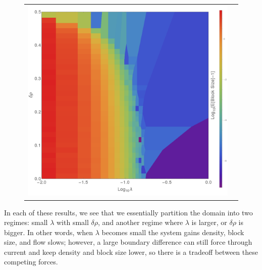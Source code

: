 \begin{figure}
\begin{center}
\begin{tabular}{c c}
\includegraphics[width=0.49\linewidth]{numerics/images/lambdaConcDiff/blockSize} \\
\end{tabular}
\end{center}
\end{figure}

In each of these results, we see that we essentially partition the domain into two regimes:
small $\lambda$ with small $\delta \rho$, and another regime where $\lambda$ is larger, or 
$\delta \rho$ is bigger. In other words, when $\lambda$ becomes small the system gains density,
block size, and flow slows; however, a large boundary difference can still force through current
and keep density and block size lower, so there is a tradeoff between these competing forces.
